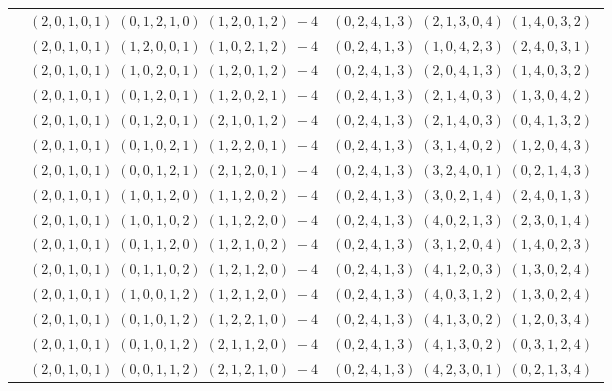 \documentclass[11pt]{article}
\begin{document}
\begin{longtable}[l]{|c|c|c|}
 \cline{2-3} 
 & $(2 ,0 ,1 ,0 ,1) \;(0 ,1 ,2 ,1 ,0) \;(1 ,2 ,0 ,1 ,2) \;-4$ & $(0 ,2 ,4 ,1 ,3) \;(2 ,1 ,3 ,0 ,4) \;(1 ,4 ,0 ,3 ,2) \;$\\ 
 \cline{2-3} 
 & $(2 ,0 ,1 ,0 ,1) \;(1 ,2 ,0 ,0 ,1) \;(1 ,0 ,2 ,1 ,2) \;-4$ & $(0 ,2 ,4 ,1 ,3) \;(1 ,0 ,4 ,2 ,3) \;(2 ,4 ,0 ,3 ,1) \;$\\ 
 \cline{2-3} 
 & $(2 ,0 ,1 ,0 ,1) \;(1 ,0 ,2 ,0 ,1) \;(1 ,2 ,0 ,1 ,2) \;-4$ & $(0 ,2 ,4 ,1 ,3) \;(2 ,0 ,4 ,1 ,3) \;(1 ,4 ,0 ,3 ,2) \;$\\ 
 \cline{2-3} 
 & $(2 ,0 ,1 ,0 ,1) \;(0 ,1 ,2 ,0 ,1) \;(1 ,2 ,0 ,2 ,1) \;-4$ & $(0 ,2 ,4 ,1 ,3) \;(2 ,1 ,4 ,0 ,3) \;(1 ,3 ,0 ,4 ,2) \;$\\ 
 \cline{2-3} 
 & $(2 ,0 ,1 ,0 ,1) \;(0 ,1 ,2 ,0 ,1) \;(2 ,1 ,0 ,1 ,2) \;-4$ & $(0 ,2 ,4 ,1 ,3) \;(2 ,1 ,4 ,0 ,3) \;(0 ,4 ,1 ,3 ,2) \;$\\ 
 \cline{2-3} 
 & $(2 ,0 ,1 ,0 ,1) \;(0 ,1 ,0 ,2 ,1) \;(1 ,2 ,2 ,0 ,1) \;-4$ & $(0 ,2 ,4 ,1 ,3) \;(3 ,1 ,4 ,0 ,2) \;(1 ,2 ,0 ,4 ,3) \;$\\ 
 \cline{2-3} 
 & $(2 ,0 ,1 ,0 ,1) \;(0 ,0 ,1 ,2 ,1) \;(2 ,1 ,2 ,0 ,1) \;-4$ & $(0 ,2 ,4 ,1 ,3) \;(3 ,2 ,4 ,0 ,1) \;(0 ,2 ,1 ,4 ,3) \;$\\ 
 \cline{2-3} 
 & $(2 ,0 ,1 ,0 ,1) \;(1 ,0 ,1 ,2 ,0) \;(1 ,1 ,2 ,0 ,2) \;-4$ & $(0 ,2 ,4 ,1 ,3) \;(3 ,0 ,2 ,1 ,4) \;(2 ,4 ,0 ,1 ,3) \;$\\ 
 \cline{2-3} 
 & $(2 ,0 ,1 ,0 ,1) \;(1 ,0 ,1 ,0 ,2) \;(1 ,1 ,2 ,2 ,0) \;-4$ & $(0 ,2 ,4 ,1 ,3) \;(4 ,0 ,2 ,1 ,3) \;(2 ,3 ,0 ,1 ,4) \;$\\ 
 \cline{2-3} 
 & $(2 ,0 ,1 ,0 ,1) \;(0 ,1 ,1 ,2 ,0) \;(1 ,2 ,1 ,0 ,2) \;-4$ & $(0 ,2 ,4 ,1 ,3) \;(3 ,1 ,2 ,0 ,4) \;(1 ,4 ,0 ,2 ,3) \;$\\ 
 \cline{2-3} 
 & $(2 ,0 ,1 ,0 ,1) \;(0 ,1 ,1 ,0 ,2) \;(1 ,2 ,1 ,2 ,0) \;-4$ & $(0 ,2 ,4 ,1 ,3) \;(4 ,1 ,2 ,0 ,3) \;(1 ,3 ,0 ,2 ,4) \;$\\ 
 \cline{2-3} 
 & $(2 ,0 ,1 ,0 ,1) \;(1 ,0 ,0 ,1 ,2) \;(1 ,2 ,1 ,2 ,0) \;-4$ & $(0 ,2 ,4 ,1 ,3) \;(4 ,0 ,3 ,1 ,2) \;(1 ,3 ,0 ,2 ,4) \;$\\ 
 \cline{2-3} 
 & $(2 ,0 ,1 ,0 ,1) \;(0 ,1 ,0 ,1 ,2) \;(1 ,2 ,2 ,1 ,0) \;-4$ & $(0 ,2 ,4 ,1 ,3) \;(4 ,1 ,3 ,0 ,2) \;(1 ,2 ,0 ,3 ,4) \;$\\ 
 \cline{2-3} 
 & $(2 ,0 ,1 ,0 ,1) \;(0 ,1 ,0 ,1 ,2) \;(2 ,1 ,1 ,2 ,0) \;-4$ & $(0 ,2 ,4 ,1 ,3) \;(4 ,1 ,3 ,0 ,2) \;(0 ,3 ,1 ,2 ,4) \;$\\ 
 \cline{2-3} 
 & $(2 ,0 ,1 ,0 ,1) \;(0 ,0 ,1 ,1 ,2) \;(2 ,1 ,2 ,1 ,0) \;-4$ & $(0 ,2 ,4 ,1 ,3) \;(4 ,2 ,3 ,0 ,1) \;(0 ,2 ,1 ,3 ,4) \;$\\ 

\end{longtable}
\end{document}
